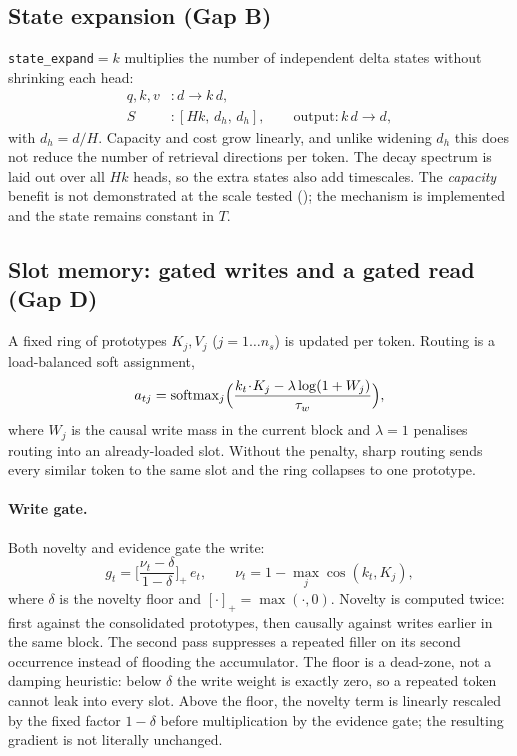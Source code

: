 \subsection{State expansion (Gap B)}
\label{sec:gap-b-method}
\texttt{state\_expand}$=k$ multiplies the number of independent delta states without shrinking
each head:
\begin{equation}
\begin{aligned}
q,k,v&: d\to k\,d,\\
S&:[Hk,\,d_h,\,d_h],\qquad \text{output}: k\,d\to d,
\end{aligned}
\end{equation}
with $d_h=d/H$. Capacity and cost grow linearly, and unlike widening $d_h$ this does not reduce
the number of retrieval directions per token. The decay spectrum is laid out over all $Hk$
heads, so the extra states also add timescales. The \emph{capacity} benefit is not demonstrated
at the scale tested (); the mechanism is implemented and the state
remains constant in $T$.

\subsection{Slot memory: gated writes and a gated read (Gap D)}
\label{sec:slot}

A fixed ring of prototypes $K_j,V_j$ ($j=1\ldots n_s$) is updated per token. Routing is a
load-balanced soft assignment,
\begin{equation}
\label{eq:route}
a_{tj}=\operatorname{softmax}_j\!\Big(\frac{k_t\!\cdot\!K_j-\lambda\log(1+W_j)}{\tau_w}\Big),
\end{equation}
where $W_j$ is the causal write mass in the current block and $\lambda=1$ penalises routing
into an already-loaded slot. Without the penalty, sharp routing sends every similar token to
the same slot and the ring collapses to one prototype.

\paragraph{Write gate.}
Both novelty and evidence gate the write:
\begin{equation}
\label{eq:write-gate}
g_t=\Big[\frac{\nu_t-\delta}{1-\delta}\Big]_{+}\,e_t,
\qquad
\nu_t=1-\max_j\cos(k_t,K_j),
\end{equation}
where $\delta$ is the novelty floor and $[\cdot]_+=\max(\cdot,0)$. Novelty is computed twice:
first against the consolidated prototypes, then causally against writes earlier in the same
block. The second pass suppresses a repeated filler on its second occurrence instead of
flooding the accumulator. The floor is a dead-zone, not a damping heuristic: below $\delta$ the
write weight is exactly zero, so a repeated token cannot leak into every slot. Above the floor,
the novelty term is linearly rescaled by the fixed factor $1-\delta$ before multiplication by
the evidence gate; the resulting gradient is not literally unchanged.

